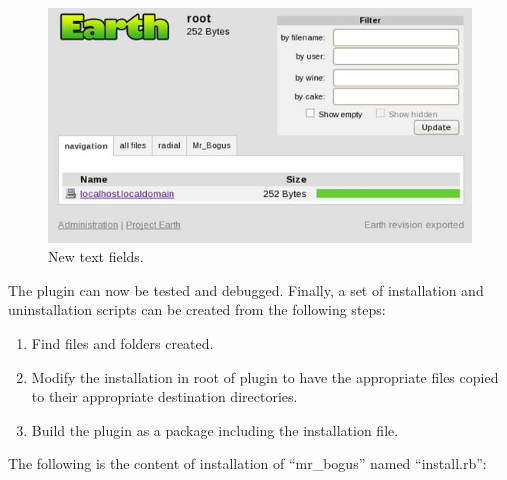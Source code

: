 \documentclass{article}
\begin{document}
\begin{figure}
\begin{centering}        
\includegraphics[width=150mm]{fig/instruction-9}
\end{centering}
\caption{New text fields.}
\label{fig:instruction-9}
\end{figure}

The plugin can now be tested and debugged. Finally, a set of installation and uninstallation scripts can be created from the following steps:

\begin{enumerate}
    \item Find files and folders created.
    \item Modify the installation in root of plugin to have the appropriate files copied to their appropriate destination directories.
    \item Build the plugin as a package including the installation file.
\end{enumerate}

The following is the content of installation of ``mr\_bogus'' named ``install.rb'':
\end{document}
